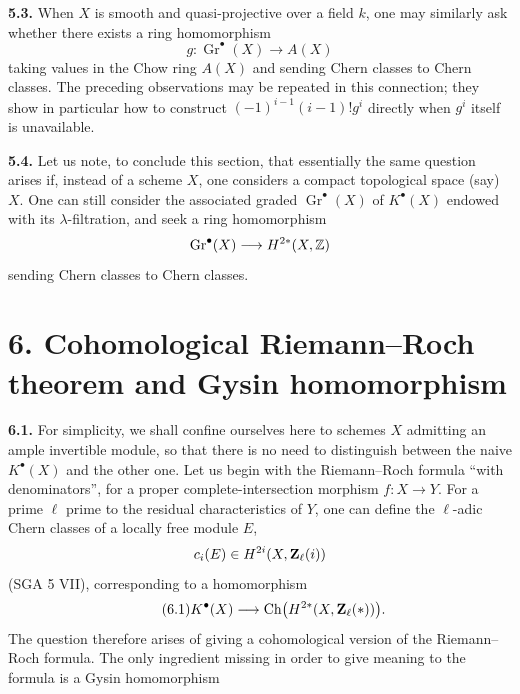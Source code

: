 \noindent{}\textbf{5.3.}
When $X$ is smooth and quasi-projective over a field $k$, one may similarly
ask whether there exists a ring homomorphism
\[
 g:\operatorname{Gr}^\bullet(X)\longrightarrow A(X)
\]
taking values in the Chow ring $A(X)$ and sending Chern classes to Chern
classes. The preceding observations may be repeated in this connection;
they show in particular how to construct $(-1)^{i-1}(i-1)!g^i$ directly
when $g^i$ itself is unavailable.

\noindent{}\textbf{5.4.}
Let us note, to conclude this section, that essentially the same question
arises if, instead of a scheme $X$, one considers a compact topological
space (say) $X$. One can still consider the associated graded
$\operatorname{Gr}^\bullet(X)$ of $K^\bullet(X)$ endowed with its
$\lambda$-filtration, and seek a ring homomorphism
\[
 \operatorname{Gr}^\bullet(X)\longrightarrow H^{2*}(X,\mathbb Z)
\]
sending Chern classes to Chern classes.

\section*{6. Cohomological Riemann--Roch theorem and Gysin homomorphism}

\noindent{}\textbf{6.1.}
For simplicity, we shall confine ourselves here to schemes $X$ admitting an
ample invertible module, so that there is no need to distinguish between the
naive $K^\bullet(X)$ and the other one. Let us begin with the Riemann--Roch
formula ``with denominators'', for a proper complete-intersection morphism
$f:X\longrightarrow Y$. For a prime $\ell$ prime to the residual
characteristics of $Y$, one can define the $\ell$-adic Chern classes of a
locally free module $E$,
\[
 c_i(E)\in H^{2i}(X,\mathbf Z_\ell(i))
\]
(SGA 5 VII), corresponding to a homomorphism
\begin{equation}\tag{6.1}
 K^\bullet(X)\longrightarrow \operatorname{Ch}\bigl(H^{2*}(X,\mathbf Z_\ell(*))\bigr).
\end{equation}
The question therefore arises of giving a cohomological version of the
Riemann--Roch formula. The only ingredient missing in order to give meaning
to the formula is a Gysin homomorphism


